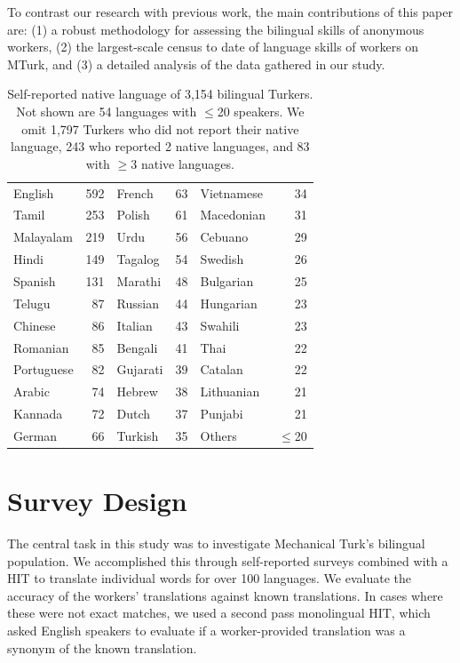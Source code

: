 \documentclass[11pt]{article}
\begin{document}
To contrast our research with previous work, the main contributions of this paper are: (1) a robust methodology for assessing the bilingual  skills of anonymous workers, (2) the largest-scale census to date of language skills of workers on MTurk, and (3) a detailed analysis of the data gathered in our study.

\begin{table}
\footnotesize
\begin{tabular}{lrlrlr}\hline\hline
\hline
English&592&	French&63&	Vietnamese&34\\
Tamil&253&	Polish&61&	Macedonian&31\\
Malayalam&219&	Urdu&56&	Cebuano&29\\
Hindi&149&	Tagalog&54&	Swedish&26\\
Spanish&131&	Marathi&48&	Bulgarian&25\\
Telugu&87&	Russian&44&	Hungarian&23\\
Chinese&86&	Italian&43&	Swahili&23\\
Romanian&85&	Bengali&41&	Thai&22\\
Portuguese&82&	Gujarati&39&	Catalan&22\\
Arabic&74&	Hebrew&38&	Lithuanian&21\\
Kannada&72&	Dutch&37&	Punjabi&21\\
German&66&	Turkish&35&	Others &$\leq$20\\
\hline\hline
\end{tabular}
\normalsize
\caption{Self-reported native language of 3,154 bilingual Turkers. Not shown are 54 languages with $\leq$20 speakers. 
We omit 1,797 Turkers who did not report their native language, 243 who reported 2 native languages, and 83 with $\geq$3 native languages.}\label{lang-pie}
\end{table}

\section{Survey Design}
The central task in this study was to investigate Mechanical Turk's bilingual population.  We accomplished this through self-reported surveys combined with a HIT to translate individual words for over 100 languages.  We evaluate the accuracy of the workers' translations against known translations.  In cases where these were not exact matches, we used a second pass monolingual HIT, which asked English speakers to evaluate if a worker-provided translation was a synonym of the known translation.
\end{document}
